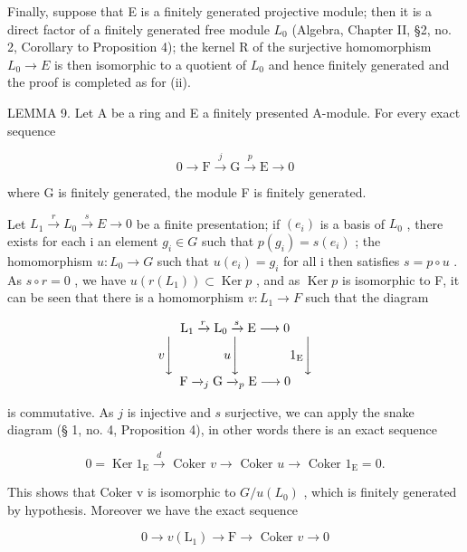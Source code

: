 Finally, suppose that E is a finitely generated projective module; then it is a direct factor of a finitely generated free module \(L_{0}\) (Algebra, Chapter II, §2, no. 2, Corollary to Proposition 4); the kernel R of the surjective homomorphism \(L_{0} \rightarrow E\) is then isomorphic to a quotient of \(L_{0}\) and hence finitely generated and the proof is completed as for (ii).

LEMMA 9. Let A be a ring and E a finitely presented A-module. For every exact sequence

\[
0 \longrightarrow \mathrm{F} \stackrel {j} {\longrightarrow} \mathrm{G} \stackrel {p} {\longrightarrow} \mathrm{E} \longrightarrow 0
\]

where G is finitely generated, the module F is finitely generated.

Let \(L_{1} \stackrel{r}{\rightarrow} L_{0} \stackrel{s}{\rightarrow} E \rightarrow 0\) be a finite presentation; if \((e_{i})\) is a basis of \(L_{0}\) , there exists for each i an element \(g_{i} \in G\) such that \(p(g_{i}) = s(e_{i})\) ; the homomorphism \(u: L_{0} \rightarrow G\) such that \(u(e_{i}) = g_{i}\) for all i then satisfies \(s = p \circ u\) . As \(s \circ r = 0\) , we have \(u(r(L_{1})) \subset \operatorname{Ker} p\) , and as \(\operatorname{Ker} p\) is isomorphic to F, it can be seen that there is a homomorphism \(v: L_{1} \rightarrow F\) such that the diagram

\[
\begin{array}{c} \mathrm{L} _ {1} \xrightarrow {r} \mathrm{L} _ {0} \xrightarrow {s} \mathrm{E} \longrightarrow 0 \\ v \Biggl \downarrow \qquad \qquad u \Biggl \downarrow \qquad \qquad 1 _ {\mathrm{E}} \Biggl \downarrow \\ \mathrm{F} \xrightarrow {} _ {j} \mathrm{G} \xrightarrow {} _ {p} \mathrm{E} \longrightarrow 0 \end{array}
\]

is commutative. As \(j\) is injective and \(s\) surjective, we can apply the snake diagram (§ 1, no. 4, Proposition 4), in other words there is an exact sequence

\[
0 = \operatorname{Ker} 1 _ {\mathrm{E}} \xrightarrow {d} \text { Coker } v \longrightarrow \text { Coker } u \longrightarrow \text { Coker } 1 _ {\mathrm{E}} = 0.
\]

This shows that Coker v is isomorphic to \(G/u(L_{0})\) , which is finitely generated by hypothesis. Moreover we have the exact sequence

\[
0 \rightarrow v (\mathrm{L} _ {1}) \rightarrow \mathrm{F} \rightarrow \text { Coker } v \rightarrow 0
\]

